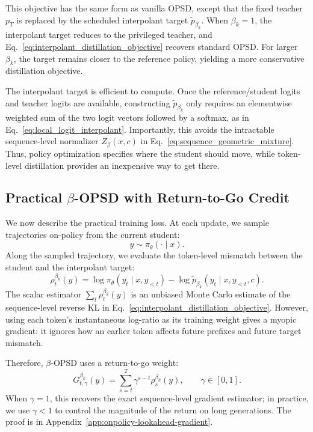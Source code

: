 This objective has the same form as vanilla OPSD, except that the fixed teacher
$p_T$ is replaced by the scheduled interpolant target $\tilde p_{\beta_k}$. When
$\beta_k=1$, the interpolant target reduces to the privileged teacher, and
Eq.~\ref{eq:interpolant_distillation_objective} recovers standard OPSD. For larger
$\beta_k$, the target remains closer to the reference policy, yielding a more conservative
distillation objective.

The interpolant target is efficient to compute. Once the reference/student logits and
teacher logits are available, constructing $\tilde p_{\beta_k}$ only requires an elementwise
weighted sum of the two logit vectors followed by a softmax, as in
Eq.~\ref{eq:local_logit_interpolant}. Importantly, this avoids the intractable
sequence-level normalizer $Z_\beta(x,c)$ in Eq.~\ref{eq:sequence_geometric_mixture}.
Thus, policy optimization specifies where the student should move, while token-level
distillation provides an inexpensive way to get there.

\subsection{Practical \texorpdfstring{$\beta$}{beta}-OPSD with Return-to-Go Credit}
\label{sec:practical_slide_objective}
We now describe the practical training loss. At each update, we sample trajectories
on-policy from the current student:
\begin{equation}
    y\sim\pi_\theta(\cdot\mid x).
\end{equation}
Along the sampled trajectory, we evaluate the token-level mismatch between the student and
the interpolant target:
\begin{equation}
    \rho_t^{\beta_k}(y)
    =
    \log \pi_\theta(y_t\mid x,y_{<t})
    -
    \log \tilde p_{\beta_k}(y_t\mid x,y_{<t},c).
    \label{eq:practical_interpolant_log_ratio}
\end{equation}
The scalar estimator $\sum_t \rho_t^{\beta_k}(y)$ is an unbiased Monte Carlo estimate of
the sequence-level reverse KL in Eq.~\ref{eq:interpolant_distillation_objective}. However,
using each token's instantaneous log-ratio as its training weight gives a myopic gradient:
it ignores how an earlier token affects future prefixes and future target mismatch.

Therefore, $\beta$-OPSD uses a return-to-go weight:
\begin{equation}
    G_{t,\gamma}^{\beta_k}(y)
    =
    \sum_{s=t}^{T}
    \gamma^{s-t}
    \rho_s^{\beta_k}(y),
    \qquad
    \gamma\in[0,1].
    \label{eq:slide_return_to_go}
\end{equation}
When $\gamma=1$, this recovers the exact sequence-level gradient estimator; in practice,
we use $\gamma<1$ to control the magnitude of the return on long generations. The proof is in Appendix~\ref{app:onpolicy-lookahead-gradient}.


